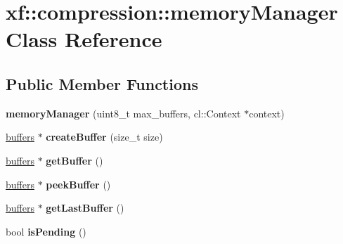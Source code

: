 \hypertarget{classxf_1_1compression_1_1memoryManager}{\section{xf\-:\-:compression\-:\-:memory\-Manager Class Reference}
\label{classxf_1_1compression_1_1memoryManager}
}
\subsection*{Public Member Functions}
\begin{DoxyCompactItemize}
\item 
\hypertarget{classxf_1_1compression_1_1memoryManager_a06244d0aae5734e40b545f9f1ce5b8ca}{{\bfseries memory\-Manager} (uint8\-\_\-t max\-\_\-buffers, cl\-::\-Context $\ast$context)}\label{classxf_1_1compression_1_1memoryManager_a06244d0aae5734e40b545f9f1ce5b8ca}

\item 
\hypertarget{classxf_1_1compression_1_1memoryManager_a41ec4b8844024a9681b5b2169d409498}{\hyperlink{structxf_1_1compression_1_1buffers}{buffers} $\ast$ {\bfseries create\-Buffer} (size\-\_\-t size)}\label{classxf_1_1compression_1_1memoryManager_a41ec4b8844024a9681b5b2169d409498}

\item 
\hypertarget{classxf_1_1compression_1_1memoryManager_aa556e1b841b4c2caf857dcca3cf61e2b}{\hyperlink{structxf_1_1compression_1_1buffers}{buffers} $\ast$ {\bfseries get\-Buffer} ()}\label{classxf_1_1compression_1_1memoryManager_aa556e1b841b4c2caf857dcca3cf61e2b}

\item 
\hypertarget{classxf_1_1compression_1_1memoryManager_ad6c764d30b210653e405ec3e1922ccdc}{\hyperlink{structxf_1_1compression_1_1buffers}{buffers} $\ast$ {\bfseries peek\-Buffer} ()}\label{classxf_1_1compression_1_1memoryManager_ad6c764d30b210653e405ec3e1922ccdc}

\item 
\hypertarget{classxf_1_1compression_1_1memoryManager_a4f063f42fc29f958f793b68e197afe59}{\hyperlink{structxf_1_1compression_1_1buffers}{buffers} $\ast$ {\bfseries get\-Last\-Buffer} ()}\label{classxf_1_1compression_1_1memoryManager_a4f063f42fc29f958f793b68e197afe59}

\item 
\hypertarget{classxf_1_1compression_1_1memoryManager_a5dc666affd08f2316ebb6bf5033c647d}{bool {\bfseries is\-Pending} ()}\label{classxf_1_1compression_1_1memoryManager_a5dc666affd08f2316ebb6bf5033c647d}


\end{DoxyCompactItemize}
